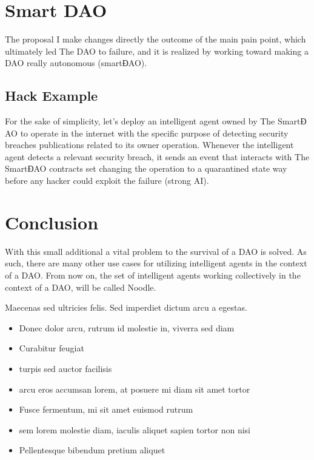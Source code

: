 \documentclass[twoside,twocolumn]{article}
\begin{document}
\section{Smart DAO}

The proposal I make changes directly the outcome of the main pain point, which ultimately led The DAO to failure, and it is realized by working toward making a DAO really autonomous (smart$Ɖ$AO).

\subsection{Hack Example}

For the sake of simplicity, let’s deploy an intelligent agent owned by The Smart$Ɖ$AO to operate in the internet with the specific purpose of detecting security breaches publications related to its owner operation.
Whenever the intelligent agent detects a relevant security breach, it sends an event that interacts with The Smart$Ɖ$AO contracts set changing the operation to a quarantined state way before any hacker could exploit the failure (strong AI).

\section{Conclusion}

With this small additional a vital problem to the survival of a DAO is solved. As such, there are many other use cases for utilizing intelligent agents in the context of a DAO. From now on, the set of intelligent agents working collectively in the context of a DAO, will be called Noodle.

Maecenas sed ultricies felis. Sed imperdiet dictum arcu a egestas. 
\begin{itemize}
\item Donec dolor arcu, rutrum id molestie in, viverra sed diam
\item Curabitur feugiat
\item turpis sed auctor facilisis
\item arcu eros accumsan lorem, at posuere mi diam sit amet tortor
\item Fusce fermentum, mi sit amet euismod rutrum
\item sem lorem molestie diam, iaculis aliquet sapien tortor non nisi
\item Pellentesque bibendum pretium aliquet
\end{itemize}
\blindtext %
\end{document}
